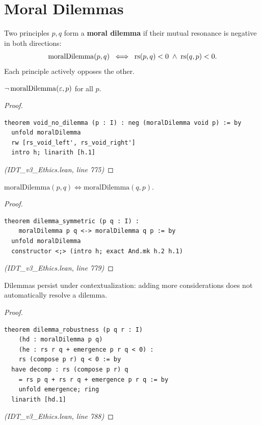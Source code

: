 \section{Moral Dilemmas}
\label{sec:moral-dilemmas}

\begin{definition}
\label{def:moral-dilemma}
Two principles $p, q$ form a \textbf{moral dilemma} if their mutual resonance
is negative in both directions:
\[
  \mathrm{moralDilemma}(p, q) \;\iff\; \mathrm{rs}(p, q) < 0 \;\wedge\; \mathrm{rs}(q, p) < 0.
\]
Each principle actively opposes the other.
\end{definition}

\begin{theorem}
\label{thm:void-no-dilemma}
$\neg\, \mathrm{moralDilemma}(\varepsilon, p)$ for all $p$.
\end{theorem}

\begin{proof}
\begin{lstlisting}
theorem void_no_dilemma (p : I) : neg (moralDilemma void p) := by
  unfold moralDilemma
  rw [rs_void_left', rs_void_right']
  intro h; linarith [h.1]
\end{lstlisting}
\textit{(IDT\_v3\_Ethics.lean, line 775)}
\end{proof}

\begin{theorem}
\label{thm:dilemma-symmetric}
$\mathrm{moralDilemma}(p, q) \iff \mathrm{moralDilemma}(q, p)$.
\end{theorem}

\begin{proof}
\begin{lstlisting}
theorem dilemma_symmetric (p q : I) :
    moralDilemma p q <-> moralDilemma q p := by
  unfold moralDilemma
  constructor <;> (intro h; exact And.mk h.2 h.1)
\end{lstlisting}
\textit{(IDT\_v3\_Ethics.lean, line 779)}
\end{proof}

\begin{theorem}
\label{thm:dilemma-robust}
Dilemmas persist under contextualization: adding more considerations does
not automatically resolve a dilemma.
\end{theorem}

\begin{proof}
\begin{lstlisting}
theorem dilemma_robustness (p q r : I)
    (hd : moralDilemma p q)
    (he : rs r q + emergence p r q < 0) :
    rs (compose p r) q < 0 := by
  have decomp : rs (compose p r) q
    = rs p q + rs r q + emergence p r q := by
    unfold emergence; ring
  linarith [hd.1]
\end{lstlisting}
\textit{(IDT\_v3\_Ethics.lean, line 788)}
\end{proof}

